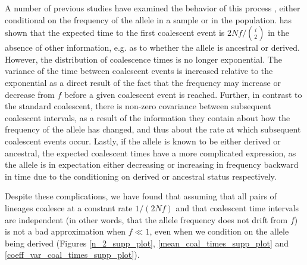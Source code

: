 \documentclass[a4paper,10pt]{article}
\begin{document}

A number of previous studies have examined the behavior of this process \citep{Wiuf1999,Wiuf:2000js,Patterson2005}, either conditional on the frequency of the allele in a sample or in the population. \cite{Wiuf:2000js} has shown that the expected time to the first coalescent event is $2 N f/ {i \choose 2}$ in the absence of other information, e.g. as to whether the allele is ancestral or derived. However, the distribution of coalescence times is no longer exponential. The variance of the time between coalescent events is increased relative to the exponential as a direct result of the fact that the frequency may increase or decrease from $f$ before a given coalescent event is reached. Further, in contrast to the standard coalescent, there is non-zero covariance between subsequent coalescent intervals, as a result of the information they contain about how the frequency of the allele has changed, and thus about the rate at which subsequent coalescent events occur. Lastly, if the allele is known to be either derived or ancestral, the expected coalescent times have a more complicated expression, as the allele is in expectation either decreasing or increasing in frequency backward in time due to the conditioning on derived or ancestral status respectively.

Despite these complications, we have found that assuming that all pairs of lineages coalesce at a constant rate $1/(2 N f)$ and that coalescent time intervals are independent (in other words, that the allele frequency does not drift from $f$) is not a bad approximation when $f \ll 1$, even when we condition on the allele being derived (Figures \ref{n_2_supp_plot}, \ref{mean_coal_times_supp_plot} and \ref{coeff_var_coal_times_supp_plot}).
\end{document}
